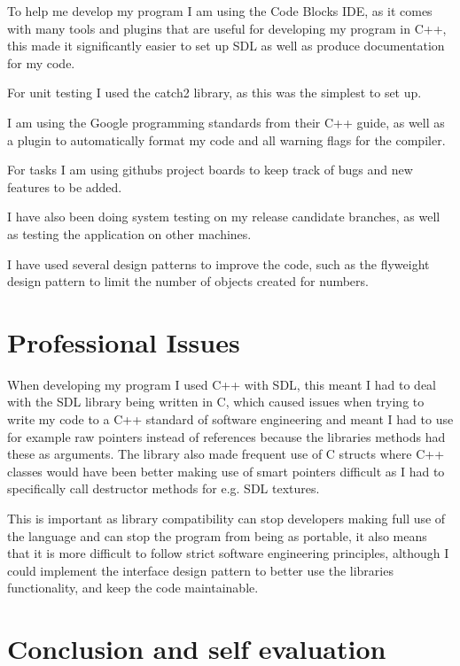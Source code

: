 \documentclass[]{final_report}
\begin{document}
To help me develop my program I am using the Code Blocks IDE, as it comes with many tools and plugins that are useful for developing my program in C++, this made it significantly easier to set up SDL as well as produce documentation for my code.

For unit testing I used the catch2 library, as this was the simplest to set up.

I am using the Google programming standards from their C++ guide, as well as a plugin to automatically format my code and all warning flags for the compiler.

For tasks I am using githubs project boards to keep track of bugs and new features to be added.

I have also been doing system testing on my release candidate branches, as well as testing the application on other machines.

I have used several design patterns to improve the code, such as the flyweight design pattern to limit the number of objects created for numbers.

\chapter*{Professional Issues}

When developing my program I used C++ with SDL, this meant I had to deal with the SDL library being written in C, which caused issues when trying to write my code to a C++ standard of software engineering and meant I had to use for example raw pointers instead of references because the libraries methods had these as arguments. The library also made frequent use of C structs where C++ classes would have been better making use of smart pointers difficult as I had to specifically call destructor methods for e.g. SDL textures.

This is important as library compatibility can stop developers making full use of the language and can stop the program from being as portable, it also means that it is more difficult to follow strict software engineering principles, although I could implement the interface design pattern to better use the libraries functionality, and keep the code maintainable.

\chapter*{Conclusion and self evaluation}
\end{document}
